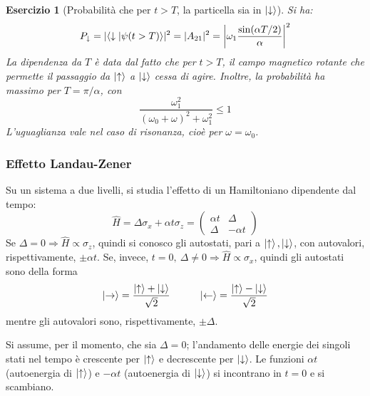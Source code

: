 \documentclass[11pt, a4paper]{scrartcl} %
\numberwithin{equation}{subsection}
\theoremstyle{style2}
\theoremstyle{style1}
\newtheorem{esercizio}{Esercizio}[section]
\begin{document}
\begin{esercizio}
	[Probabilit\`a che per $t>T$, la particella sia in $\ket{\downarrow} $]	


	Si ha:
	\begin{equation}
	P_\downarrow = \lvert \braket{\downarrow|\psi (t>T)}  \rvert ^2 = \lvert A_{21} \rvert ^2 = \left\lvert \omega_1 \frac{\sin (\alpha T / 2)}{\alpha } \right\rvert ^2
	\end{equation}
	La dipendenza da $T $ \`e data dal fatto che per $t>T$, il campo magnetico rotante che permette il passaggio da $\ket{\uparrow} $ a $\ket{\downarrow} $ cessa di agire. 
	Inoltre, la probabilit\`a ha massimo per $T = \pi / \alpha $, con
	\begin{equation}
		\frac{\omega_1^2 }{(\omega_0+\omega)^2 + \omega_1^2}\le  1
	\end{equation}
	L'uguaglianza vale nel caso di risonanza, cio\`e per $\omega = \omega_0$.
\end{esercizio}
\subsubsection{Effetto Landau-Zener}
Su un sistema a due livelli, si studia l'effetto di un Hamiltoniano dipendente dal tempo:
\begin{equation}
	\hat{H}= \Delta \sigma _x + \alpha  t \sigma _z = \begin{pmatrix} \alpha  t & \Delta \\ \Delta  & - \alpha  t \end{pmatrix} 
\end{equation}
Se $\Delta = 0\Rightarrow \hat{H} \propto \sigma _z$, quindi si conosco gli autostati, pari a $\ket{\uparrow} , \ket{\downarrow}$, con autovalori, rispettivamente, $\pm \alpha t$.
Se, invece, $t=0, \ \Delta \neq 0\Rightarrow \hat{H} \propto \sigma _x$, quindi gli autostati sono della forma
\[
\ket{\rightarrow}  = \frac{\ket{\uparrow} + \ket{\downarrow} }{\sqrt{2} } \hspace{1cm}\ket{\leftarrow} = \frac{\ket{\uparrow} -\ket{\downarrow} }{\sqrt{2} }
\] 
mentre gli autovalori sono, rispettivamente, $\pm\Delta $.

Si assume, per il momento, che sia $\Delta =0 $; l'andamento delle energie dei singoli stati nel tempo \`e crescente per $\ket{\uparrow} $ e decrescente per $\ket{\downarrow} $. 
Le funzioni $\alpha t$ (autoenergia di $\ket{\uparrow} $) e $- \alpha t$ (autoenergia di $\ket{\downarrow} $) si incontrano in $t=0$ e si scambiano.
\end{document}
